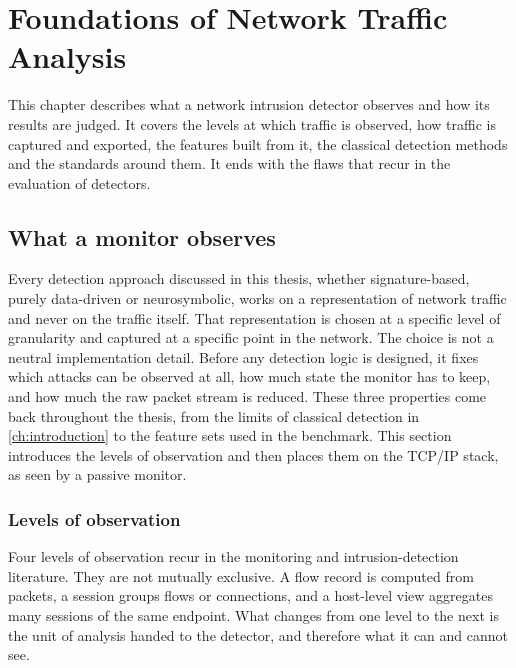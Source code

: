 \chapter{Foundations of Network Traffic Analysis}
\label{ch:foundations}

This chapter describes what a network intrusion detector observes and how its results are
judged. It covers the levels at which traffic is observed, how traffic is captured and exported,
the features built from it, the classical detection methods and the standards around them. It
ends with the flaws that recur in the evaluation of detectors.

\section{What a monitor observes}
\label{sec:network-observation-levels}

Every detection approach discussed in this thesis, whether signature-based,
purely data-driven or neurosymbolic, works on a representation of network
traffic and never on the traffic itself. That representation is chosen at a
specific level of granularity and captured at a specific point in the
network. The choice is not a neutral implementation detail. Before any
detection logic is designed, it fixes which attacks can be observed at all,
how much state the monitor has to keep, and how much the raw packet stream
is reduced. These three properties come back throughout the thesis, from the
limits of classical detection in \cref{ch:introduction} to the feature sets
used in the benchmark. This section introduces the levels of observation and
then places them on the TCP/IP stack, as seen by a passive monitor.

\subsection{Levels of observation}
\label{sec:levels-packet-flow-session-host}

Four levels of observation recur in the monitoring and intrusion-detection
literature. They are not mutually exclusive. A flow record is computed from
packets, a session groups flows or connections, and a host-level view
aggregates many sessions of the same endpoint. What changes from one level
to the next is the unit of analysis handed to the detector, and therefore
what it can and cannot see.

